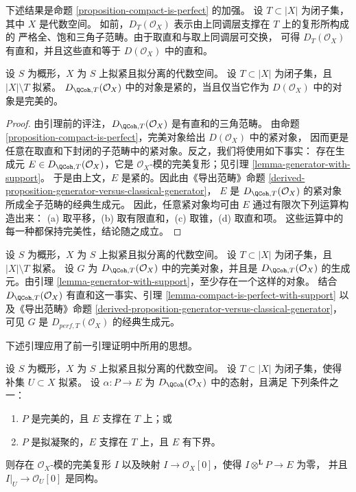 \noindent
下述结果是命题 \ref{proposition-compact-is-perfect} 的加强。
设 $T \subset |X|$ 为闭子集，其中 $X$ 是代数空间。
如前，$D_T(\mathcal{O}_X)$ 表示由上同调层支撑在 $T$ 上的复形所构成的
严格全、饱和三角子范畴。由于取直和与取上同调层可交换，
可得 $D_T(\mathcal{O}_X)$ 有直和，并且这些直和等于
$D(\mathcal{O}_X)$ 中的直和。

\begin{lemma}
\label{lemma-compact-is-perfect-with-support}
设 $S$ 为概形，$X$ 为 $S$ 上拟紧且拟分离的代数空间。
设 $T \subset |X|$ 为闭子集，且 $|X| \setminus T$ 拟紧。
$D_{\QCoh, T}(\mathcal{O}_X)$ 中的对象是紧的，当且仅当它作为
$D(\mathcal{O}_X)$ 中的对象是完美的。
\end{lemma}

\begin{proof}
由引理前的评注，$D_{\QCoh, T}(\mathcal{O}_X)$ 是有直和的三角范畴。
由命题 \ref{proposition-compact-is-perfect}，完美对象给出
$D(\mathcal{O}_X)$ 中的紧对象，%
因而更是任意在取直和下封闭的子范畴中的紧对象。反之，我们将使用如下事实：
存在生成元 $E \in D_{\QCoh, T}(\mathcal{O}_X)$，它是
$\mathcal{O}_X$-模的完美复形；见引理
\ref{lemma-generator-with-support}。%
于是由上文，$E$ 是紧的。因此由《导出范畴》命题
\ref{derived-proposition-generator-versus-classical-generator}，
$E$ 是 $D_{\QCoh, T}(\mathcal{O}_X)$ 的紧对象所成全子范畴的经典生成元。
因此，任意紧对象均可由 $E$ 通过有限次下列运算构造出来：
(a) 取平移，(b) 取有限直和，(c) 取锥，(d) 取直和项。
这些运算中的每一种都保持完美性，结论随之成立。
\end{proof}

\begin{remark}
\label{remark-classical-generator-with-support}
设 $S$ 为概形，$X$ 为 $S$ 上拟紧且拟分离的代数空间。
设 $T \subset |X|$ 为闭子集，且 $|X| \setminus T$ 拟紧。
设 $G$ 为 $D_{\QCoh, T}(\mathcal{O}_X)$ 中的完美对象，并且是
$D_{\QCoh, T}(\mathcal{O}_X)$ 的生成元。由引理
\ref{lemma-generator-with-support}，至少存在一个这样的对象。
结合 $D_{\QCoh, T}(\mathcal{O}_X)$ 有直和这一事实、引理
\ref{lemma-compact-is-perfect-with-support} 以及《导出范畴》命题
\ref{derived-proposition-generator-versus-classical-generator}，
可见 $G$ 是 $D_{perf, T}(\mathcal{O}_X)$ 的经典生成元。
\end{remark}

\noindent
下述引理应用了前一引理证明中所用的思想。

\begin{lemma}
\label{lemma-map-from-pseudo-coherent-to-complex-with-support}
设 $S$ 为概形，$X$ 为 $S$ 上拟紧且拟分离的代数空间。
设 $T \subset |X|$ 为闭子集，使得补集 $U \subset X$ 拟紧。
设 $\alpha : P \to E$ 为 $D_\QCoh(\mathcal{O}_X)$ 中的态射，且满足
下列条件之一：
\begin{enumerate}
\item $P$ 是完美的，且 $E$ 支撑在 $T$ 上；或
\item $P$ 是拟凝聚的，$E$ 支撑在 $T$ 上，且 $E$ 有下界。
\end{enumerate}
则存在 $\mathcal{O}_X$-模的完美复形 $I$ 以及映射
$I \to \mathcal{O}_X[0]$，使得 $I \otimes^\mathbf{L} P \to E$ 为零，
并且 $I|_U \to \mathcal{O}_U[0]$ 是同构。
\end{lemma}

